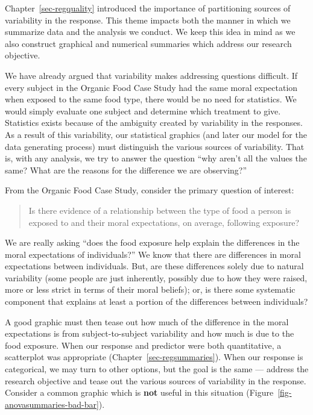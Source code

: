 \documentclass[
  letterpaper,
  DIV=11,
  numbers=noendperiod]{scrreprt}
\theoremstyle{definition}
\theoremstyle{definition}
\theoremstyle{plain}
\theoremstyle{remark}
\begin{document}
Chapter~\ref{sec-regquality} introduced the importance of partitioning
sources of variability in the response. This theme impacts both the
manner in which we summarize data and the analysis we conduct. We keep
this idea in mind as we also construct graphical and numerical summaries
which address our research objective.

We have already argued that variability makes addressing questions
difficult. If every subject in the Organic Food Case Study had the same
moral expectation when exposed to the same food type, there would be no
need for statistics. We would simply evaluate one subject and determine
which treatment to give. Statistics exists because of the ambiguity
created by variability in the responses. As a result of this
variability, our statistical graphics (and later our model for the data
generating process) must distinguish the various sources of variability.
That is, with any analysis, we try to answer the question ``why aren't
all the values the same? What are the reasons for the difference we are
observing?''

From the Organic Food Case Study, consider the primary question of
interest:

\begin{quote}
Is there evidence of a relationship between the type of food a person is
exposed to and their moral expectations, on average, following exposure?
\end{quote}

We are really asking ``does the food exposure help explain the
differences in the moral expectations of individuals?'' We know that
there are differences in moral expectations between individuals. But,
are these differences solely due to natural variability (some people are
just inherently, possibly due to how they were raised, more or less
strict in terms of their moral beliefs); or, is there some systematic
component that explains at least a portion of the differences between
individuals?

A good graphic must then tease out how much of the difference in the
moral expectations is from subject-to-subject variability and how much
is due to the food exposure. When our response and predictor were both
quantitative, a scatterplot was appropriate
(Chapter~\ref{sec-regsummaries}). When our response is categorical, we
may turn to other options, but the goal is the same --- address the
research objective and tease out the various sources of variability in
the response. Consider a common graphic which is \textbf{not} useful in
this situation (Figure~\ref{fig-anovasummaries-bad-bar}).
\end{document}
